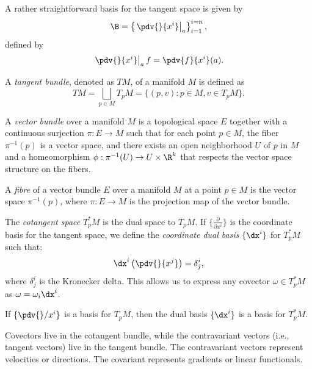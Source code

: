 
A rather straightforward basis for the tangent space is given by
\[%
  \B = \left\{\left.\pdv{}{x^i}\right\rvert_a\right\}_{i=1}^{i=n}
,\]%
defined by
\[%
  \left.\pdv{}{x^i}\right\rvert_a f = \pdv{f}{x^i}(a)
.\]%

\begin{definition}
  A \emph{tangent bundle}, denoted as $TM$, of a manifold $M$ is defined as
  \[%
    TM = \bigsqcup_{p \in M} T_pM = \{(p, v) : p \in M, v \in T_pM\}
  .\]%
\end{definition}


\begin{definition}
  A \emph{vector bundle} over a manifold $M$ is a topological space $E$ together with a continuous surjection $\pi : E \to M$ such that for each point $p \in M$, the fiber $\pi^{-1}(p)$ is a vector space, and there exists an open neighborhood $U$ of $p$ in $M$ and a homeomorphism $\phi : \pi^{-1}(U) \to U \times \R^k$ that respects the vector space structure on the fibers.
\end{definition}

\begin{definition}
  A \emph{fibre} of a vector bundle $E$ over a manifold $M$ at a point $p \in M$ is the vector space $\pi^{-1}(p)$, where $\pi : E \to M$ is the projection map of the vector bundle.
\end{definition}

\begin{definition}
  The \emph{cotangent space} $T_p^*M$ is the dual space to $T_pM$. If $\{ \frac{\partial}{\partial x^i} \}$ is the coordinate basis for the tangent space, we define the \emph{coordinate dual basis} $\{ \dx^i \}$ for $T_p^*M$ such that:
  \[%
    \dx^i \left( \pdv{}{x^j} \right) = \delta^i_j
  ,\]%
  where $\delta^i_j$ is the Kronecker delta. This allows us to express any covector $\omega \in T_p^*M$ as $\omega = \omega_i \dx^i$.
\end{definition}

\begin{note}
  If $\{\pdv{}/{x^i}\}$ is a basis for $T_pM$, then the dual basis $\{\dx^i\}$ is a basis for $T_p^*M$.
\end{note}

\begin{note}
  Covectors live in the cotangent bundle, while the contravariant vectors (i.e., tangent vectors) live in the tangent bundle. The contravariant vectors represent velocities or directions. The covariant represents gradients or linear functionals.
\end{note}

